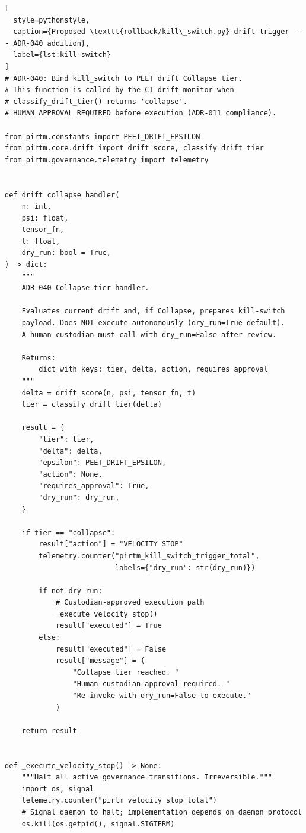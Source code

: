 \documentclass[11pt,letterpaper]{article}
\theoremstyle{definition}
\theoremstyle{remark}
\begin{document}
\begin{lstlisting}[
  style=pythonstyle,
  caption={Proposed \texttt{rollback/kill\_switch.py} drift trigger --- ADR-040 addition},
  label={lst:kill-switch}
]
# ADR-040: Bind kill_switch to PEET drift Collapse tier.
# This function is called by the CI drift monitor when
# classify_drift_tier() returns 'collapse'.
# HUMAN APPROVAL REQUIRED before execution (ADR-011 compliance).

from pirtm.constants import PEET_DRIFT_EPSILON
from pirtm.core.drift import drift_score, classify_drift_tier
from pirtm.governance.telemetry import telemetry


def drift_collapse_handler(
    n: int,
    psi: float,
    tensor_fn,
    t: float,
    dry_run: bool = True,
) -> dict:
    """
    ADR-040 Collapse tier handler.

    Evaluates current drift and, if Collapse, prepares kill-switch
    payload. Does NOT execute autonomously (dry_run=True default).
    A human custodian must call with dry_run=False after review.

    Returns:
        dict with keys: tier, delta, action, requires_approval
    """
    delta = drift_score(n, psi, tensor_fn, t)
    tier = classify_drift_tier(delta)

    result = {
        "tier": tier,
        "delta": delta,
        "epsilon": PEET_DRIFT_EPSILON,
        "action": None,
        "requires_approval": True,
        "dry_run": dry_run,
    }

    if tier == "collapse":
        result["action"] = "VELOCITY_STOP"
        telemetry.counter("pirtm_kill_switch_trigger_total",
                          labels={"dry_run": str(dry_run)})

        if not dry_run:
            # Custodian-approved execution path
            _execute_velocity_stop()
            result["executed"] = True
        else:
            result["executed"] = False
            result["message"] = (
                "Collapse tier reached. "
                "Human custodian approval required. "
                "Re-invoke with dry_run=False to execute."
            )

    return result


def _execute_velocity_stop() -> None:
    """Halt all active governance transitions. Irreversible."""
    import os, signal
    telemetry.counter("pirtm_velocity_stop_total")
    # Signal daemon to halt; implementation depends on daemon protocol
    os.kill(os.getpid(), signal.SIGTERM)
\end{lstlisting}
\end{document}
